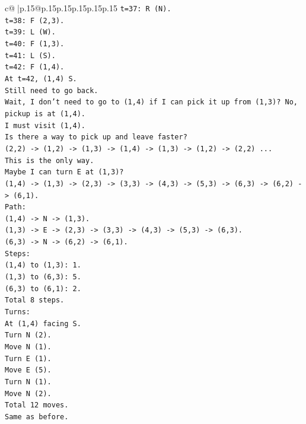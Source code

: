 \documentclass{article}
\begin{document}
{\begin{supertabular}{c@{$\;$}|p{.15\linewidth}@{}p{.15\linewidth}p{.15\linewidth}p{.15\linewidth}p{.15\linewidth}p{.15\linewidth}}
{{{\texttt{t=37: R (N).} \\
\texttt{t=38: F (2,3).} \\
\texttt{t=39: L (W).} \\
\texttt{t=40: F (1,3).} \\
\texttt{t=41: L (S).} \\
\texttt{t=42: F (1,4).} \\
\texttt{At t=42, (1,4) S.} \\
\texttt{Still need to go back.} \\
\texttt{Wait, I don't need to go to (1,4) if I can pick it up from (1,3)? No, pickup is at (1,4).} \\
\texttt{I must visit (1,4).} \\
\texttt{Is there a way to pick up and leave faster?} \\
\texttt{(2,2) {-}> (1,2) {-}> (1,3) {-}> (1,4) {-}> (1,3) {-}> (1,2) {-}> (2,2) ...} \\
\texttt{This is the only way.} \\
\texttt{Maybe I can turn E at (1,3)?} \\
\texttt{(1,4) {-}> (1,3) {-}> (2,3) {-}> (3,3) {-}> (4,3) {-}> (5,3) {-}> (6,3) {-}> (6,2) {-}> (6,1).} \\
\texttt{Path:} \\
\texttt{(1,4) {-}> N {-}> (1,3).} \\
\texttt{(1,3) {-}> E {-}> (2,3) {-}> (3,3) {-}> (4,3) {-}> (5,3) {-}> (6,3).} \\
\texttt{(6,3) {-}> N {-}> (6,2) {-}> (6,1).} \\
\texttt{Steps:} \\
\texttt{(1,4) to (1,3): 1.} \\
\texttt{(1,3) to (6,3): 5.} \\
\texttt{(6,3) to (6,1): 2.} \\
\texttt{Total 8 steps.} \\
\texttt{Turns:} \\
\texttt{At (1,4) facing S.} \\
\texttt{Turn N (2).} \\
\texttt{Move N (1).} \\
\texttt{Turn E (1).} \\
\texttt{Move E (5).} \\
\texttt{Turn N (1).} \\
\texttt{Move N (2).} \\
\texttt{Total 12 moves.} \\
\texttt{Same as before.} \\
}}}
\end{supertabular}}
\end{document}
